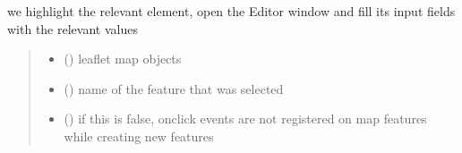 \documentclass[letterpaper,10pt,english]{sphinxmanual}
\begin{document}
\begin{fulllineitems}
\label{\detokenize{docs_gui/js_api/network_editor/display_editable_network_features:clickOnMarker}}
\pysigstartsignatures
{}
\pysigstopsignatures\begin{description}
\sphinxAtStartPar
we highlight the relevant element, open the Editor window and fill its input fields with the relevant values

\end{description}
\begin{quote}\begin{description}
\begin{itemize}
\item {} 
\sphinxAtStartPar
{} () \textendash{} leaflet map objects

\item {} 
\sphinxAtStartPar
{} () \textendash{} name of the feature that was selected

\item {} 
\sphinxAtStartPar
{} () \textendash{} if this is false, onclick events are not registered on map features while creating new features

\end{itemize}

\end{description}\end{quote}

\end{fulllineitems}

\end{document}
